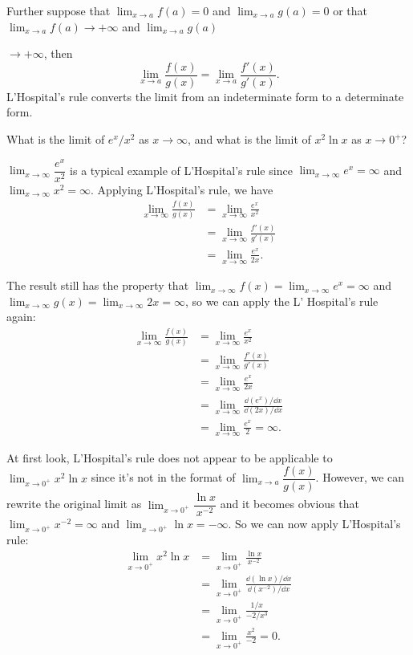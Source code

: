 Further suppose that $\lim_{x\to a}f(a)=0$ and $\lim_{x\to a}g(a)=0$ or that
$\lim_{x\to a}f(a)\to+\infty$ and $\lim_{x\to a}g(a)$

$\to+\infty$, then
\[
\lim_{x\to a}\frac{f(x)}{g(x)}=\lim_{x\to a}\frac{f'(x)}{g'(x)}.
\]
L'Hospital's rule converts the limit from an indeterminate form to a determinate form.

\begin{problem}{What is the limit of $e^x/x^2$ as $x\to\infty$, and what is the limit of $x^2\ln x$ as $x\to0^+$?}
\end{problem}

\begin{solution}

$\lim_{x\to\infty}\dfrac{e^x}{x^2}$ is a typical example of L'Hospital's rule since
$\lim_{x\to\infty}e^x=\infty$ and $\lim_{x\to\infty}x^2=\infty$. Applying L'Hospital's rule, we have
\[
\begin{aligned}
\lim_{x\to\infty}\frac{f(x)}{g(x)}
&=\lim_{x\to\infty}\frac{e^x}{x^2}\\
&=\lim_{x\to\infty}\frac{f'(x)}{g'(x)}\\
&=\lim_{x\to\infty}\frac{e^x}{2x}.
\end{aligned}
\]

The result still has the property that $\lim_{x\to\infty}f(x)=\lim_{x\to\infty}e^x=\infty$ and
$\lim_{x\to\infty}g(x)=\lim_{x\to\infty}2x=\infty$, so we can apply the L' Hospital's rule again:
\[
\begin{aligned}
\lim_{x\to\infty}\frac{f(x)}{g(x)}
&=\lim_{x\to\infty}\frac{e^x}{x^2}\\
&=\lim_{x\to\infty}\frac{f'(x)}{g'(x)}\\
&=\lim_{x\to\infty}\frac{e^x}{2x}\\
&=\lim_{x\to\infty}\frac{\dd(e^x)/\dd x}{\dd(2x)/\dd x}\\
&=\lim_{x\to\infty}\frac{e^x}{2}=\infty.
\end{aligned}
\]

At first look, L'Hospital's rule does not appear to be applicable to
$\lim_{x\to0^+}x^2\ln x$ since it's not in the format of
$\lim_{x\to a}\dfrac{f(x)}{g(x)}$. However, we can rewrite the original limit as
$\lim_{x\to0^+}\dfrac{\ln x}{x^{-2}}$ and it becomes obvious that
$\lim_{x\to0^+}x^{-2}=\infty$ and $\lim_{x\to0^+}\ln x=-\infty$. So we can now apply
L'Hospital's rule:
\[
\begin{aligned}
\lim_{x\to0^+}x^2\ln x
&=\lim_{x\to0^+}\frac{\ln x}{x^{-2}}\\
&=\lim_{x\to0^+}\frac{\dd(\ln x)/\dd x}{\dd(x^{-2})/\dd x}\\
&=\lim_{x\to0^+}\frac{1/x}{-2/x^3}\\
&=\lim_{x\to0^+}\frac{x^2}{-2}=0.
\end{aligned}
\]

\end{solution}

